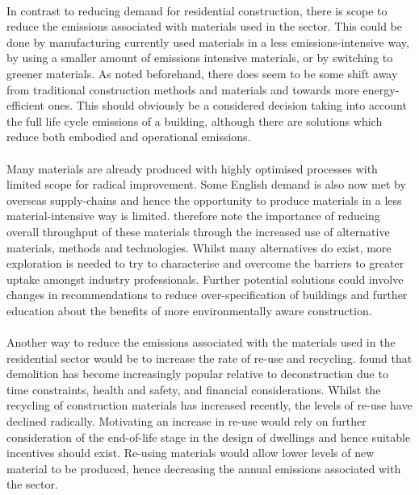 \documentclass[12pt]{article}
\begin{document}
\paragraph{}
In contrast to reducing demand for residential construction, there is scope to reduce the emissions associated with materials used in the sector. This could be done by manufacturing currently used materials in a less emissions-intensive way, by using a smaller amount of emissions intensive materials, or by switching to greener materials. As noted beforehand, there does seem to be some shift away from traditional construction methods and materials and towards more energy-efficient ones. This should obviously be a considered decision taking into account the full life cycle emissions of a building, although there are solutions which reduce both embodied and operational emissions. 

\paragraph{}
Many materials are already produced with highly optimised processes with limited scope for radical improvement. Some English demand is also now met by overseas supply-chains and hence the opportunity to produce materials in a less material-intensive way is limited. \citet{Giesekam2014-eg} therefore note the importance of reducing overall throughput of these materials through the increased use of alternative materials, methods and technologies. Whilst many alternatives do exist, more exploration is needed to try to characterise and overcome the barriers to greater uptake amongst industry professionals. Further potential solutions could involve changes in recommendations to reduce over-specification of buildings and further education about the benefits of more environmentally aware construction. 

\paragraph{}
Another way to reduce the emissions associated with the materials used in the residential sector would be to increase the rate of re-use and recycling. \citet{Giesekam2014-eg} found that demolition has become increasingly popular relative to deconstruction due to time constraints, health and safety, and financial considerations. Whilst the recycling of construction materials has increased recently, the levels of re-use have declined radically. Motivating an increase in re-use would rely on further consideration of the end-of-life stage in the design of dwellings and hence suitable incentives should exist. Re-using materials would allow lower levels of new material to be produced, hence decreasing the annual emissions associated with the sector.
\end{document}

